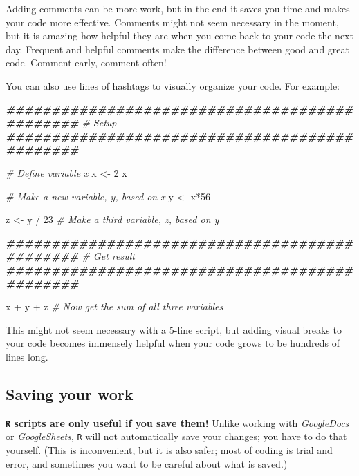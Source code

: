 \documentclass[
]{book}
\newenvironment{Shaded}{\begin{snugshade}}{\end{snugshade}}
\newcommand{\CommentTok}[1]{\textcolor[rgb]{0.56,0.35,0.01}{\textit{#1}}}
\newcommand{\DecValTok}[1]{\textcolor[rgb]{0.00,0.00,0.81}{#1}}
\newcommand{\DocumentationTok}[1]{\textcolor[rgb]{0.56,0.35,0.01}{\textbf{\textit{#1}}}}
\newcommand{\NormalTok}[1]{#1}
\newcommand{\OtherTok}[1]{\textcolor[rgb]{0.56,0.35,0.01}{#1}}
\newcommand{\SpecialCharTok}[1]{\textcolor[rgb]{0.00,0.00,0.00}{#1}}
\begin{document}
Adding comments can be more work, but in the end it saves you time and makes your code more effective. Comments might not seem necessary in the moment, but it is amazing how helpful they are when you come back to your code the next day. Frequent and helpful comments make the difference between good and great code. Comment early, comment often!

You can also use lines of hashtags to visually organize your code. For example:

\begin{Shaded}
\begin{Highlighting}[]
\DocumentationTok{\#\#\#\#\#\#\#\#\#\#\#\#\#\#\#\#\#\#\#\#\#\#\#\#\#\#\#\#\#\#\#\#\#\#\#\#\#\#\#\#\#\#\#\#\#\#}
\CommentTok{\# Setup}
\DocumentationTok{\#\#\#\#\#\#\#\#\#\#\#\#\#\#\#\#\#\#\#\#\#\#\#\#\#\#\#\#\#\#\#\#\#\#\#\#\#\#\#\#\#\#\#\#\#\#}

\CommentTok{\# Define variable x}
\NormalTok{x }\OtherTok{\textless{}{-}} \DecValTok{2} 
\NormalTok{x}

\CommentTok{\# Make a new variable, y, based on x}
\NormalTok{y }\OtherTok{\textless{}{-}}\NormalTok{ x}\SpecialCharTok{*}\DecValTok{56}

\NormalTok{z }\OtherTok{\textless{}{-}}\NormalTok{ y }\SpecialCharTok{/} \DecValTok{23} \CommentTok{\# Make a third variable, z, based on y}
 

\DocumentationTok{\#\#\#\#\#\#\#\#\#\#\#\#\#\#\#\#\#\#\#\#\#\#\#\#\#\#\#\#\#\#\#\#\#\#\#\#\#\#\#\#\#\#\#\#\#\#}
\CommentTok{\# Get result}
\DocumentationTok{\#\#\#\#\#\#\#\#\#\#\#\#\#\#\#\#\#\#\#\#\#\#\#\#\#\#\#\#\#\#\#\#\#\#\#\#\#\#\#\#\#\#\#\#\#\#}

\NormalTok{x }\SpecialCharTok{+}\NormalTok{ y }\SpecialCharTok{+}\NormalTok{ z }\CommentTok{\# Now get the sum of all three variables}
\end{Highlighting}
\end{Shaded}

This might not seem necessary with a 5-line script, but adding visual breaks to your code becomes immensely helpful when your code grows to be hundreds of lines long.

\hypertarget{saving-your-work}{%
\subsection*{Saving your work}\label{saving-your-work}}

\textbf{\texttt{R} scripts are only useful if you save them!} Unlike working with \emph{GoogleDocs} or \emph{GoogleSheets}, \texttt{R} will not automatically save your changes; you have to do that yourself. (This is inconvenient, but it is also safer; most of coding is trial and error, and sometimes you want to be careful about what is saved.)
\end{document}
